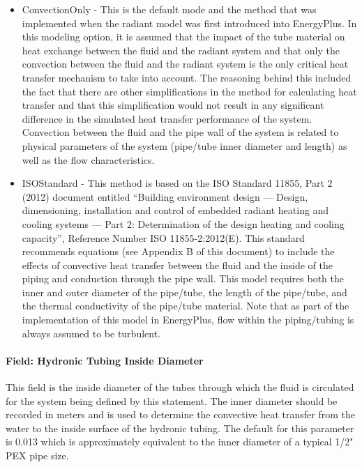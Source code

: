 \begin{itemize}
	\item
	ConvectionOnly - This is the default mode and the method that was implemented when the radiant model was first introduced into EnergyPlus.  In this modeling option, it is assumed that the impact of the tube material on heat exchange between the fluid and the radiant system and that only the convection between the fluid and the radiant system is the only critical heat transfer mechanism to take into account.  The reasoning behind this included the fact that there are other simplifications in the method for calculating heat transfer and that this simplification would not result in any significant difference in the simulated heat transfer performance of the system.  Convection between the fluid and the pipe wall of the system is related to physical parameters of the system (pipe/tube inner diameter and length) as well as the flow characteristics.
	\item
	ISOStandard - This method is based on the ISO Standard 11855, Part 2 (2012) document entitled ``Building environment design — Design, dimensioning, installation and control of embedded radiant heating and cooling systems — Part 2: Determination of the design heating and cooling capacity'', Reference Number ISO 11855-2:2012(E).  This standard recommends equations (see Appendix B of this document) to include the effects of convective heat transfer between the fluid and the inside of the piping and conduction through the pipe wall.  This model requires both the inner and outer diameter of the pipe/tube, the length of the pipe/tube, and the thermal conductivity of the pipe/tube material.  Note that as part of the implementation of this model in EnergyPlus, flow within the piping/tubing is always assumed to be turbulent.
\end{itemize}

\paragraph{Field: Hydronic Tubing Inside Diameter}\label{field-hydronic-tubing-inside-diameter-000}

This field is the inside diameter of the tubes through which the fluid is circulated for the system being defined by this statement. The inner diameter should be recorded in meters and is used to determine the convective heat transfer from the water to the inside surface of the hydronic tubing.  The default for this parameter is 0.013 which is approximately equivalent to the inner diameter of a typical 1/2" PEX pipe size.

